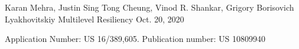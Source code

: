 

\begin{cventries}

  \cventry
    {Karan Mehra, Justin Sing Tong Cheung, Vinod R. Shankar, Grigory Borisovich Lyakhovitskiy} %
    {Multilevel Resiliency}
    {}
    {Oct. 20, 2020} %
    {
      \begin{cvitems}
        \item {
          Application Number: US 16/389,605. Publication number: US 10809940
        }
      \end{cvitems}
    }

\end{cventries}